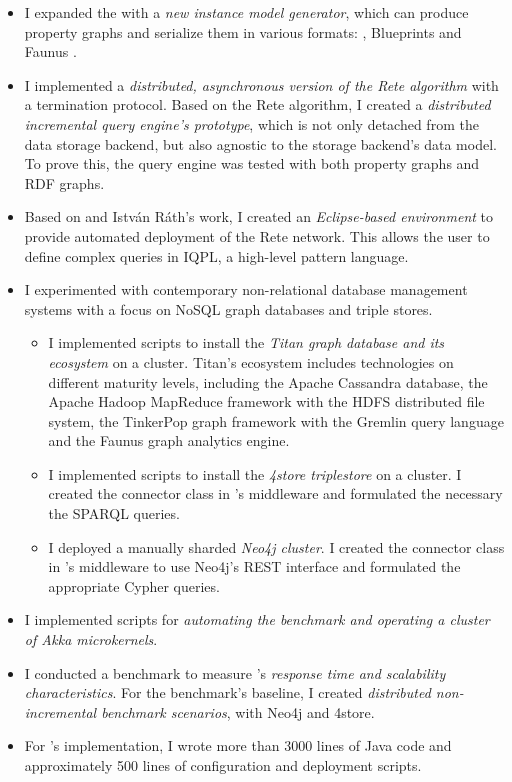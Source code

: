 \begin{itemize}
  \item I expanded the \tb{} with a \emph{new instance model generator}, which can produce property graphs and serialize them in various formats: \graphml{}, Blueprints \graphson{} and Faunus \graphson{}. %
  \item I implemented a \emph{distributed, asynchronous version of the Rete algorithm} with a termination protocol. Based on the Rete algorithm, I created a \emph{distributed incremental query engine's prototype}, which is not only detached from the data storage backend, but also agnostic to the storage backend's data model. To prove this, the query engine was tested with both property graphs and RDF graphs. 
  \item Based on \eiq{} and István Ráth's work, I created an \emph{Eclipse-based environment} to provide automated deployment of the Rete network. This allows the user to define complex queries in IQPL, a high-level pattern language. %
  \item I experimented with contemporary non-relational database management systems with a focus on NoSQL graph databases and triple stores.
  \begin{itemize}
    \item I implemented scripts to install the \emph{Titan graph database and its ecosystem} on a cluster. Titan's ecosystem includes technologies on different maturity levels, including the Apache Cassandra database, the Apache Hadoop MapReduce framework with the HDFS distributed file system, the TinkerPop graph framework with the Gremlin query language and the Faunus graph analytics engine.
    \item I implemented scripts to install the \emph{4store triplestore} on a cluster. I created the connector class in \iqd{}'s middleware and formulated the necessary the SPARQL queries. 
    \item I deployed a manually sharded \emph{Neo4j cluster}. I created the connector class in \iqd{}'s middleware to use Neo4j's REST interface and formulated the appropriate Cypher queries.
  \end{itemize}
  \item I implemented scripts for \emph{automating the benchmark and operating a cluster of Akka microkernels}.
  \item I conducted a benchmark to measure \iqd{}'s \emph{response time and scalability characteristics}. For the benchmark's baseline, I created \emph{distributed non-incremental benchmark scenarios}, with Neo4j and 4store. 
  \item For \iqd{}'s implementation, I wrote more than 3000 lines of Java code and approximately 500 lines of configuration and deployment scripts.
\end{itemize}


